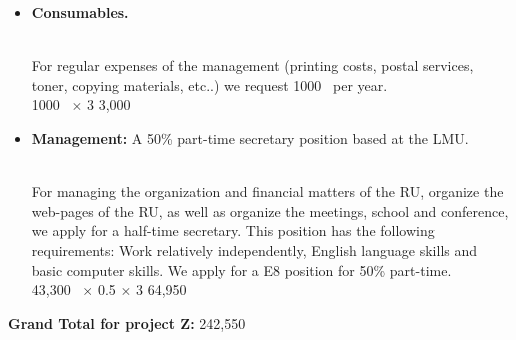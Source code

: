 \documentclass[10pt,fleqn,twoside]{article}
\begin{document}
\begin{itemize}
We intend to wrap up the RU with an international small size conference
on the topic (roughly 60 participants). We apply for 30,000~\EUR{} for this.
\vspace{0.2em}\\
30,000~\EUR{} $\times$ 1              \hfill 30,000~\EUR{}\\
\item 
\begin{Emphasize}
{\bf Consumables.}
\end{Emphasize}\\
For regular expenses of the management (printing costs, postal services, toner,
copying materials, etc..) we request 1000~\EUR{} per year.
\vspace{0.2em}\\
1000~\EUR{} $\times$ 3              \hfill 3,000~\EUR{}\\
\item 
\begin{Emphasize}
{\bf Management:} A 50\% part-time secretary position based at the LMU.
\end{Emphasize}\\
For managing the organization and financial matters of the RU, 
organize the web-pages of the RU, as
well as organize the meetings, school and conference, we apply for
a half-time secretary. This position has the following requirements:
Work relatively independently, English language skills and 
basic computer skills. We apply for a E8 position for 50\% part-time.
\vspace{0.2em}\\
43,300~\EUR{} $\times$ 0.5 $\times$ 3              \hfill 64,950~\EUR{}\\
\end{itemize}

\begin{Emphasize}
{\bf Grand Total for project Z:}  \hfill 242,550~\EUR{} \\
\end{Emphasize}\\
 
\end{document}
